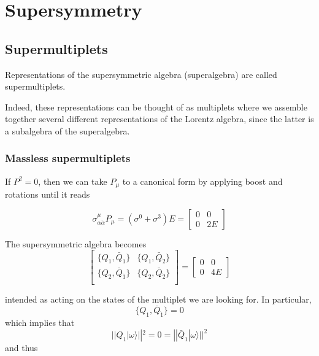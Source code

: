\chapter{Supersymmetry}
\section{Supermultiplets}

\begin{definition}[Supermultiplet]
  Representations of the supersymmetric algebra (superalgebra) are called
  supermultiplets.
\end{definition}

Indeed, these representations can be thought of as multiplets where we assemble
together several different representations of the Lorentz algebra, since the
latter is a subalgebra of the superalgebra.

\subsection{Massless supermultiplets}
If $P^2=0$, then we can take $P_\mu$ to a canonical form by applying boost and
rotations until it reads

\begin{equation}
  \sigma^{\mu}_{\alpha\dot{\alpha}}P_\mu = \left(\sigma^0+\sigma^3\right)E = 
  \begin{bmatrix}
    0 & 0\\
    0 & 2E
  \end{bmatrix}
\end{equation}

The supersymmetric algebra becomes 
\begin{equation}
  \begin{bmatrix}
    \{Q_1,\bar{Q}_{\dot{1}}\} & \{Q_1,\bar{Q}_{\dot{2}}\} \\

    \{Q_2,\bar{Q}_{\dot{1}}\} & \{Q_2,\bar{Q}_{\dot{2}}\} \\

  \end{bmatrix}
  =
  \begin{bmatrix}
    0 & 0\\
    0 & 4E
  \end{bmatrix}
\end{equation}

intended as acting on the states of the multiplet we are looking for. In
particular,
\begin{equation}
\{Q_1, \bar{Q}_{\dot{1}}\} = 0
\end{equation}
which implies that 
\begin{equation}
  ||Q_1|\omega\rangle||^2 = 0 = ||\bar{Q}_{\dot{1}}|\omega\rangle||^2
\end{equation}
and thus

